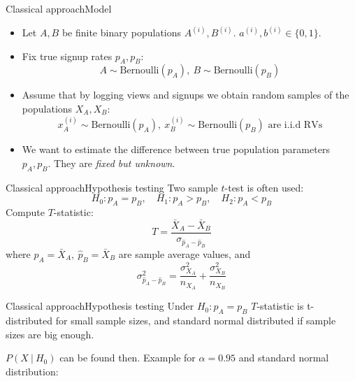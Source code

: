 \documentclass[pdf]{beamer}
\begin{document}
\begin{frame}{Classical approach}{Model}

\begin{itemize}
	\item Let $A, B$ be finite binary populations $ A^{(i)}, B^{(i)}.$ $a^{(i)}, b^{(i)} \in \{0, 1\}$.

	\item Fix true signup rates $p_A, p_B$: 
	$$ A \sim \text{Bernoulli}(p_A),\ B \sim \text{Bernoulli}(p_B) $$

	\item Assume that by logging views and signups we obtain random samples of the populations $X_A, X_B$:
	$$x_A^{(i)} \sim \text{Bernoulli}(p_A),\ x_B^{(i)} \sim \text{Bernoulli}(p_B) \text{ are i.i.d RVs} $$
	\item We want to estimate the difference between true population parameters $p_A, p_B$. They are \emph{fixed but unknown}.
\end{itemize}

\end{frame}


\begin{frame}{Classical approach}{Hypothesis testing}
Two sample $t$-test is often used:
$$ H_0: p_A = p_B,\quad H_1: p_A > p_B,\quad H_2: p_A < p_B $$
Compute $T$-statistic:
$$ T = \frac{\bar X_A - \bar X_B}{\sigma_{\hat p_A - \hat p_B}}$$
where $\hat p_A = \bar X_A,\ \hat p_B = \bar X_B$ are sample average values, and
$$\sigma_{\hat p_A - \hat p_B}^2 = \frac{\sigma_{X_A}^2}{n_{X_A}} + \frac{\sigma_{X_B}^2}{n_{X_B}}$$
\end{frame}


\begin{frame}{Classical approach}{Hypothesis testing}
Under $H_0: p_A = p_B$ $T$-statistic is t-distributed for small sample sizes, and standard normal distributed if sample sizes are big enough. 

$P(X~|~H_0)$ can be found then. Example for $\alpha=0.95$ and standard normal distribution:


\end{frame}
\end{document}
